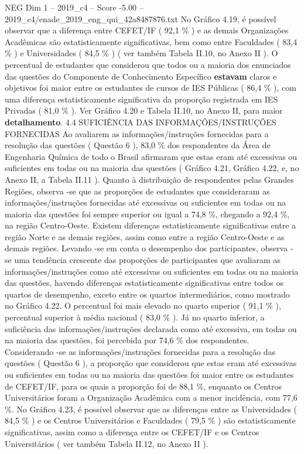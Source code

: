 \begin{textsample}{NEG Dim 1 – 2019\_c4 – Score -5.00 – 2019\_c4/enade\_2019\_eng\_qui\_42a8487876.txt}
No Gráfico 4.19, é possível observar que a diferença entre CEFET/IF ( 92,1 \% ) e as demais Organizações Acadêmicas são estatisticamente significativas, bem como entre Faculdades ( 83,4 \% ) e Universidades ( 84,5 \% ) ( ver também Tabela II.10, no Anexo II ).
O percentual de estudantes que considerou que todos ou a maioria dos enunciados das questões do Componente de Conhecimento Específico \textbf{estavam} claros e objetivos foi maior entre os estudantes de cursos de IES Públicas ( 86,4 \% ), com uma diferença estatisticamente significativa da proporção registrada em IES Privadas ( 81,0 \% ).
Ver Gráfico 4.20 e Tabela II.10, no Anexo II, para maior \textbf{detalhamento}. 4.4 SUFICIÊNCIA DAS INFORMAÇÕES/INSTRUÇÕES FORNECIDAS Ao avaliarem as informações/instruções fornecidas para a resolução das questões ( Questão 6 ), 83,0 \% dos respondentes da Área de Engenharia Química de todo o Brasil afirmaram que estas eram até excessivas ou suficientes em todas ou na maioria das questões ( Gráfico 4.21, Gráfico 4.22, e, no Anexo II, a Tabela II.11 ).
Quanto à distribuição de respondentes pelas Grandes Regiões, observa -se que as proporções de estudantes que consideraram as informações/instruções fornecidas até excessivas ou suficientes em todas ou na maioria das questões foi sempre superior ou igual a 74,8 \%, chegando a 92,4 \%, na região Centro-Oeste.
Existem diferenças estatisticamente significativas entre a região Norte e as demais regiões, assim como entre a região Centro-Oeste e as demais regiões.
Levando -se em conta o desempenho dos participantes, observa -se uma tendência crescente das proporções de participantes que avaliaram as informações/instruções como até excessivas ou suficientes em todas ou na maioria das questões, havendo diferenças estatisticamente significativas entre todos os quartos de desempenho, exceto entre os quartos intermediários, como mostrado no Gráfico 4.22.
O percentual foi mais elevado no quarto superior ( 91,1 \% ), percentual superior à média nacional ( 83,0 \% ).
Já no quarto inferior, a suficiência das informações/instruções declarada como até excessiva, em todas ou na maioria das questões, foi percebida por 74,6 \% dos respondentes.
Considerando -se as informações/instruções fornecidas para a resolução das questões ( Questão 6 ), a proporção que considerou que estas eram até excessivas ou suficientes em todas ou na maioria das questões foi maior entre os estudantes de CEFET/IF, para os quais a proporção foi de 88,1 \%, enquanto os Centros Universitários foram a Organização Acadêmica com a menor incidência, com 77,6 \%.
No Gráfico 4.23, é possível observar que as diferenças entre as Universidades ( 84,5 \% ) e os Centros Universitários e Faculdades ( 79,5 \% ) são estatisticamente significativas, assim como a diferença entre os CEFET/IF e os Centros Universitários ( ver também Tabela II.12, no Anexo II ).

\end{textsample}
